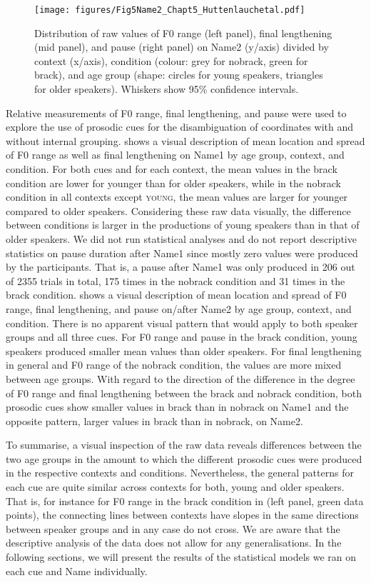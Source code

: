 \documentclass[output=paper]{langscibook}
\begin{document}
\begin{figure}[p]
\texttt{[image: figures/Fig5Name2\_Chapt5\_Huttenlauchetal.pdf]}
\caption{Distribution of raw values of F0 range (left panel), final lengthening (mid panel), and pause (right panel) on Name2 (y\-/axis) divided by context (x\-/axis), condition (colour: grey for nobrack, green for brack), and age group (shape: circles for young speakers, triangles for older speakers). Whiskers show 95\% confidence intervals.}
\label{fig:name2}
\end{figure}

Relative measurements of F0 range, final lengthening, and pause were used to explore the use of prosodic cues for the disambiguation of coordinates with and without internal grouping.  shows a visual description of mean location and spread of F0 range as well as final lengthening on Name1 by age group, context, and condition. For both cues and for each context, the mean values in the brack condition are lower for younger than for older speakers, while in the nobrack condition in all contexts except \textsc{young}, the mean values are larger for younger compared to older speakers. Considering these raw data visually, the difference between conditions is larger in the productions of young speakers than in that of older speakers. We did not run statistical analyses and do not report descriptive statistics on pause duration after Name1 since mostly zero values were produced by the participants. That is, a pause after Name1 was only produced in 206 out of 2355 trials in total, 175 times in the nobrack condition and 31 times in the brack condition.  shows a visual description of mean location and spread of F0 range, final lengthening, and pause on\fshyp after Name2 by age group, context, and condition. There is no apparent visual pattern that would apply to both speaker groups and all three cues. For F0 range and pause in the brack condition, young speakers produced smaller mean values than older speakers. For final lengthening in general and F0 range of the nobrack condition, the values are more mixed between age groups. With regard to the direction of the difference in the degree of F0 range and final lengthening between the brack and nobrack condition, both prosodic cues show smaller values in brack than in nobrack on Name1 and the opposite pattern, larger values in brack than in nobrack, on Name2.

To summarise, a visual inspection of the raw data reveals differences between the two age groups in the amount to which the different prosodic cues were produced in the respective contexts and conditions. Nevertheless, the general patterns for each cue are quite similar across contexts for both, young and older speakers. That is, for instance for F0 range in the brack condition in  (left panel, green data points), the connecting lines between contexts have slopes in the same directions between speaker groups and in any case do not cross. We are aware that the descriptive analysis of the data does not allow for any generalisations. In the following sections, we will present the results of the statistical models we ran on each cue and Name individually. 
\end{document}
